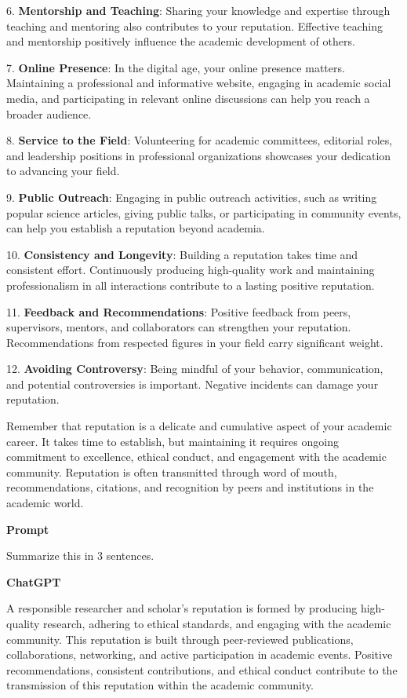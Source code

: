 \documentclass[12pt]{article}
\begin{document}
6. {\bf Mentorship and Teaching}: Sharing your knowledge and expertise through teaching and mentoring also contributes to your reputation. Effective teaching and mentorship positively influence the academic development of others.

7. {\bf Online Presence}: In the digital age, your online presence matters. Maintaining a professional and informative website, engaging in academic social media, and participating in relevant online discussions can help you reach a broader audience.

8. {\bf Service to the Field}: Volunteering for academic committees, editorial roles, and leadership positions in professional organizations showcases your dedication to advancing your field.

9. {\bf Public Outreach}: Engaging in public outreach activities, such as writing popular science articles, giving public talks, or participating in community events, can help you establish a reputation beyond academia.

10. {\bf Consistency and Longevity}: Building a reputation takes time and consistent effort. Continuously producing high-quality work and maintaining professionalism in all interactions contribute to a lasting positive reputation.

11. {\bf Feedback and Recommendations}: Positive feedback from peers, supervisors, mentors, and collaborators can strengthen your reputation. Recommendations from respected figures in your field carry significant weight.

12. {\bf Avoiding Controversy}: Being mindful of your behavior, communication, and potential controversies is important. Negative incidents can damage your reputation.

Remember that reputation is a delicate and cumulative aspect of your academic career. It takes time to establish, but maintaining it requires ongoing commitment to excellence, ethical conduct, and engagement with the academic community. Reputation is often transmitted through word of mouth, recommendations, citations, and recognition by peers and institutions in the academic world.

{\bf Prompt}

Summarize this in 3 sentences.

{\bf ChatGPT}

A responsible researcher and scholar's reputation is formed by producing high-quality research, adhering to ethical standards, and engaging with the academic community. This reputation is built through peer-reviewed publications, collaborations, networking, and active participation in academic events. Positive recommendations, consistent contributions, and ethical conduct contribute to the transmission of this reputation within the academic community.
\end{document}
